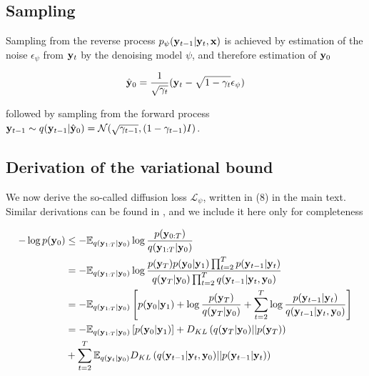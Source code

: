 \subsection{Sampling}

Sampling from the reverse process $p_{\psi}(\bold{y}_{t-1}\lvert\bold{y}_{t},\bold{x})$ is achieved by estimation of the noise $\epsilon_{\psi}$ from $\bold{y}_{t}$ by the denoising model $\psi$, and therefore estimation of $\bold{y}_{0}$

\begin{equation}
\hat{\bold{y}}_{0} = \frac{1}{\sqrt{\gamma_{t}}}(\bold{y}_{t} - \sqrt{1-\gamma_{t}}\epsilon_{\psi})
\end{equation}

followed by sampling from the forward process $\bold{y}_{t-1} \sim q(\bold{y}_{t-1}\lvert\hat{\bold{y}}_{0}) = \mathcal{N}(\sqrt{\gamma_{t-1}},(1-\gamma_{t-1})I)$. 


\subsection{Derivation of the variational bound}

We now derive the so-called diffusion loss $\mathcal{L}_{\psi}$, written in (8) in the main text. Similar derivations can be found in \parencite{Kingma2021,Ribeiro2024}, and we include it here only for completeness

\begin{align*}
-\log p(\bold{y}_{0}) &\leq - \mathbb{E}_{q(\bold{y}_{1:T}\lvert\bold{y}_{0})} \log \frac{p(\bold{y}_{0:T})}{q(\bold{y}_{1:T}\lvert\bold{y}_{0})}\\
&= -\mathbb{E}_{q(\bold{y}_{1:T}\lvert\bold{y}_{0})} \log \frac{p(\bold{y}_{T})p(\bold{y}_0\lvert\bold{y}_1) \prod_{t=2}^{T}p(\bold{y}_{t-1}\lvert\bold{y}_t)}{q(\bold{y}_T\lvert\bold{y}_0)\prod_{t=2}^{T}q(\bold{y}_{t-1}\lvert\bold{y}_t,\bold{y}_0)}\\
&= -\mathbb{E}_{q(\bold{y}_{1:T}\lvert\bold{y}_{0})} \left[ p(\bold{y}_0\lvert\bold{y}_1) + \log \frac{p(\bold{y}_{T})}{q(\bold{y}_T\lvert\bold{y}_0)} + \sum_{t=2}^{T} \log \frac{p(\bold{y}_{t-1}\lvert\bold{y}_t)}{q(\bold{y}_{t-1}\lvert\bold{y}_t,\bold{y}_0)}\right]\\
&= -\mathbb{E}_{q(\bold{y}_{1:T}\lvert\bold{y}_{0})} \left[ p(\bold{y}_0\lvert\bold{y}_1)\right] + D_{KL}\left(q(\bold{y}_T\lvert\bold{y}_0) \lvert\lvert p(\bold{y}_{T})\right) \\
&+ \sum_{t=2}^{T} \mathbb{E}_{q(\bold{y}_{t}\lvert\bold{y}_{0})} D_{KL}\left(q(\bold{y}_{t-1}\lvert\bold{y}_t,\bold{y}_0)\lvert\lvert p(\bold{y}_{t-1}\lvert\bold{y}_t) \right)
\end{align*}

